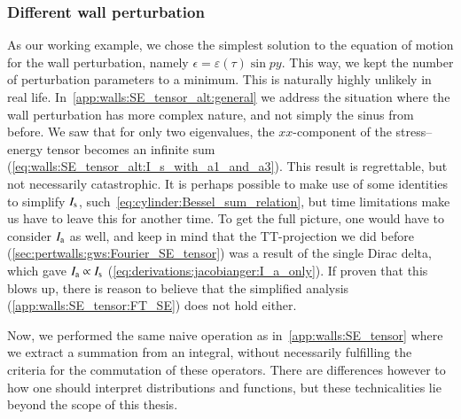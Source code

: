 \subsubsection{Different wall perturbation}
    As our working example, we chose the simplest solution to the equation of motion for the wall perturbation, namely $\epsilon= \varepsilon(\tau)\sin{py}$. This way, we kept the number of perturbation parameters to a minimum. This is naturally highly unlikely in real life. 
    In~\cref{app:walls:SE_tensor_alt:general} we address the situation where the wall perturbation has more complex nature, and not simply the sinus from before. We saw that for only two eigenvalues, the $xx$-component of the stress--energy tensor becomes an infinite sum (\cref{eq:walls:SE_tensor_alt:I_s_with_a1_and_a3}). %
    This result is regrettable, but not necessarily catastrophic. %
    It is perhaps possible to make use of some identities to simplify $I_\mathrm{s}$, such~\cref{eq:cylinder:Bessel_sum_relation}, 
    but time limitations make us have to leave this for another time. To get the full picture, one would have to consider $I_\mathrm{a}$ as well, and keep in mind that the TT-projection we did before (\cref{sec:pertwalls:gws:Fourier_SE_tensor}) was a result of the single Dirac delta, which gave $I_\mathrm{a}\propto I_\mathrm{s}$ (\cref{eq:derivations:jacobianger:I_a_only}). %
    If proven that this blows up, there is reason to believe that the simplified analysis (\cref{app:walls:SE_tensor:FT_SE}) does not hold either. %


    Now, we performed the same naive operation as in~\cref{app:walls:SE_tensor} where we extract a summation from an integral, without necessarily fulfilling the criteria for the commutation of these operators. There are differences however to how one should interpret distributions and functions, but these technicalities lie beyond the scope of this thesis.

    




